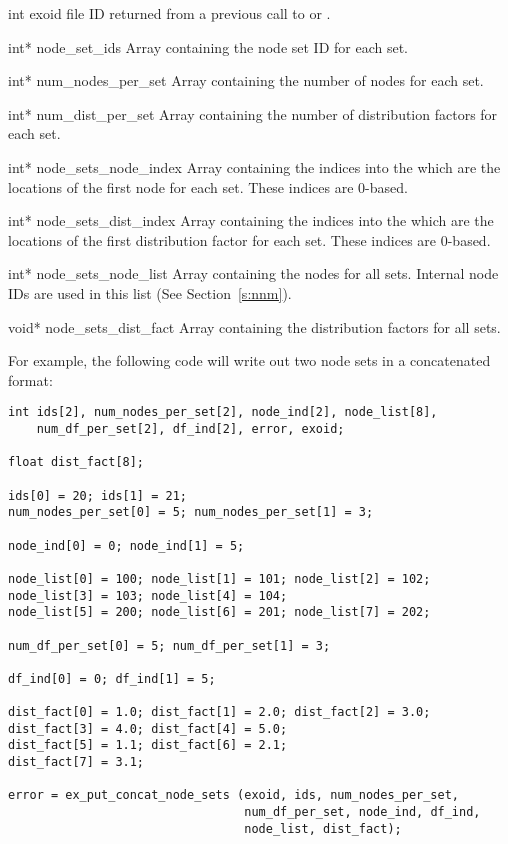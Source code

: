 \begin{parameters}
\item[{int exoid \R{}}]
\exo{} file ID returned from a previous call to  
or .

\item[{int* node_set_ids \R{}}]
Array containing the node set ID for each set.

\item[{int* num_nodes_per_set \R{}}]
Array containing the number of nodes for each set.

\item[{int* num_dist_per_set \R{}}]
Array containing the number of distribution factors for each set.

\item[{int* node_sets_node_index \R{}}]
Array containing the indices into the  which
are the locations of the first node for each set. These indices are
0-based.

\item[{int* node_sets_dist_index \R{}}]
Array containing the indices into the  which
are the locations of the first distribution factor for each set. These
indices are 0-based.

\item[{int* node_sets_node_list \R{}}]
Array containing the nodes for all sets. Internal node IDs are used in
this list (See Section~\ref{s:nnm}).

\item[{void* node_sets_dist_fact \R{}}]
Array containing the distribution factors for all sets.
\end{parameters}

For example, the following code will write out two node sets 
in a concatenated format:

\begin{lstlisting}
int ids[2], num_nodes_per_set[2], node_ind[2], node_list[8],
    num_df_per_set[2], df_ind[2], error, exoid;

float dist_fact[8];

ids[0] = 20; ids[1] = 21;
num_nodes_per_set[0] = 5; num_nodes_per_set[1] = 3;

node_ind[0] = 0; node_ind[1] = 5;

node_list[0] = 100; node_list[1] = 101; node_list[2] = 102;
node_list[3] = 103; node_list[4] = 104;
node_list[5] = 200; node_list[6] = 201; node_list[7] = 202;

num_df_per_set[0] = 5; num_df_per_set[1] = 3;

df_ind[0] = 0; df_ind[1] = 5;

dist_fact[0] = 1.0; dist_fact[1] = 2.0; dist_fact[2] = 3.0;
dist_fact[3] = 4.0; dist_fact[4] = 5.0;
dist_fact[5] = 1.1; dist_fact[6] = 2.1; 
dist_fact[7] = 3.1;

error = ex_put_concat_node_sets (exoid, ids, num_nodes_per_set, 
                                 num_df_per_set, node_ind, df_ind, 
                                 node_list, dist_fact);
\end{lstlisting}

